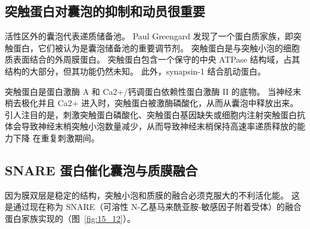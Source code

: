 \subsection{突触蛋白对囊泡的抑制和动员很重要}

活性区外的囊泡代表递质储备池。
Paul Greengard 发现了一个蛋白质家族，即突触蛋白，它们被认为是囊泡储备池的重要调节剂。
突触蛋白是与突触小泡的细胞质表面结合的外周膜蛋白。 突触蛋白包含一个保守的中央 ATPase 结构域，占其结构的大部分，但其功能仍然未知。
此外，synapsin-1 结合肌动蛋白。


突触蛋白是蛋白激酶 A 和 Ca2+/钙调蛋白依赖性蛋白激酶 II 的底物。
当神经末梢去极化并且 Ca2+ 进入时，突触蛋白被激酶磷酸化，从而从囊泡中释放出来。
引人注目的是，刺激突触蛋白磷酸化、突触蛋白基因缺失或细胞内注射突触蛋白抗体会导致神经末梢突触小泡数量减少，从而导致神经末梢保持高速率递质释放的能力下降 在重复刺激期间。



\subsection{SNARE 蛋白催化囊泡与质膜融合}

因为膜双层是稳定的结构，突触小泡和质膜的融合必须克服大的不利活化能。
这是通过现在称为 SNARE（可溶性 N-乙基马来酰亚胺-敏感因子附着受体）的融合蛋白家族实现的（图~\ref{fig:15_12}）。


